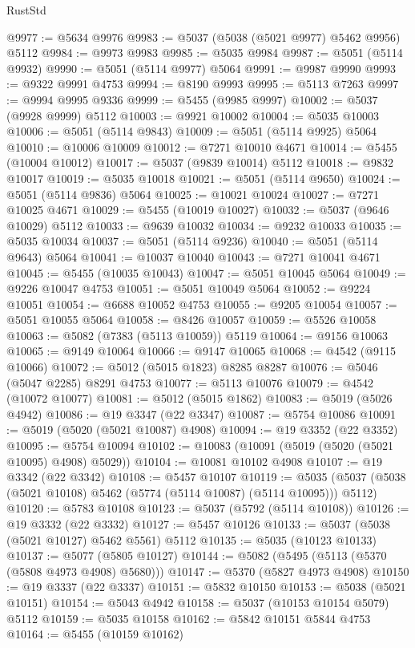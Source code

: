 \begin{lexlean}{RustStd}
\begin{coremodule}
@9977 := @5634 @9976
@9983 := @5037 (@5038 (@5021 @9977) @5462 @9956) @5112
@9984 := @9973 @9983
@9985 := @5035 @9984
@9987 := @5051 (@5114 @9932)
@9990 := @5051 (@5114 @9977) @5064
@9991 := @9987 @9990
@9993 := @9322 @9991 @4753
@9994 := @8190 @9993
@9995 := @5113 @7263
@9997 := @9994 @9995 @9336
@9999 := @5455 (@9985 @9997)
@10002 := @5037 (@9928 @9999) @5112
@10003 := @9921 @10002
@10004 := @5035 @10003
@10006 := @5051 (@5114 @9843)
@10009 := @5051 (@5114 @9925) @5064
@10010 := @10006 @10009
@10012 := @7271 @10010 @4671
@10014 := @5455 (@10004 @10012)
@10017 := @5037 (@9839 @10014) @5112
@10018 := @9832 @10017
@10019 := @5035 @10018
@10021 := @5051 (@5114 @9650)
@10024 := @5051 (@5114 @9836) @5064
@10025 := @10021 @10024
@10027 := @7271 @10025 @4671
@10029 := @5455 (@10019 @10027)
@10032 := @5037 (@9646 @10029) @5112
@10033 := @9639 @10032
@10034 := @9232 @10033
@10035 := @5035 @10034
@10037 := @5051 (@5114 @9236)
@10040 := @5051 (@5114 @9643) @5064
@10041 := @10037 @10040
@10043 := @7271 @10041 @4671
@10045 := @5455 (@10035 @10043)
@10047 := @5051 @10045 @5064
@10049 := @9226 @10047 @4753
@10051 := @5051 @10049 @5064
@10052 := @9224 @10051
@10054 := @6688 @10052 @4753
@10055 := @9205 @10054
@10057 := @5051 @10055 @5064
@10058 := @8426 @10057
@10059 := @5526 @10058
@10063 := @5082 (@7383 (@5113 @10059)) @5119
@10064 := @9156 @10063
@10065 := @9149 @10064
@10066 := @9147 @10065
@10068 := @4542 (@9115 @10066)
@10072 := @5012 (@5015 @1823) @8285 @8287
@10076 := @5046 (@5047 @2285) @8291 @4753
@10077 := @5113 @10076
@10079 := @4542 (@10072 @10077)
@10081 := @5012 (@5015 @1862)
@10083 := @5019 (@5026 @4942)
@10086 := @19 @3347 (@22 @3347)
@10087 := @5754 @10086
@10091 := @5019 (@5020 (@5021 @10087) @4908)
@10094 := @19 @3352 (@22 @3352)
@10095 := @5754 @10094
@10102 := @10083 (@10091 (@5019 (@5020 (@5021 @10095) @4908) @5029))
@10104 := @10081 @10102 @4908
@10107 := @19 @3342 (@22 @3342)
@10108 := @5457 @10107
@10119 := @5035 (@5037 (@5038 (@5021 @10108) @5462 (@5774 (@5114 @10087) (@5114 @10095))) @5112)
@10120 := @5783 @10108
@10123 := @5037 (@5792 (@5114 @10108))
@10126 := @19 @3332 (@22 @3332)
@10127 := @5457 @10126
@10133 := @5037 (@5038 (@5021 @10127) @5462 @5561) @5112
@10135 := @5035 (@10123 @10133)
@10137 := @5077 (@5805 @10127)
@10144 := @5082 (@5495 (@5113 (@5370 (@5808 @4973 @4908) @5680)))
@10147 := @5370 (@5827 @4973 @4908)
@10150 := @19 @3337 (@22 @3337)
@10151 := @5832 @10150
@10153 := @5038 (@5021 @10151)
@10154 := @5043 @4942
@10158 := @5037 (@10153 @10154 @5079) @5112
@10159 := @5035 @10158
@10162 := @5842 @10151 @5844 @4753
@10164 := @5455 (@10159 @10162)

\end{coremodule}
\end{lexlean}
